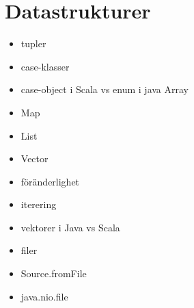 \chapter{Datastrukturer}
\begin{itemize}[nosep]
\item tupler
\item case-klasser
\item case-object i Scala vs enum i java Array
\item Map
\item List
\item Vector
\item föränderlighet
\item iterering
\item vektorer i Java vs Scala
\item filer
\item Source.fromFile
\item java.nio.file\end{itemize}
